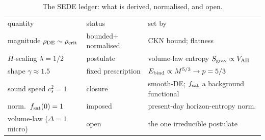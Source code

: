 \begin{table}[t]
\caption{The SEDE ledger: what is derived, normalised, and open.}\label{tab:ledger}
\begin{ruledtabular}
\small
\begin{tabular}{@{}p{}p{}p{}@{}}
quantity & status & set by \\ \colrule
magnitude $\rho_{\mathrm{DE}}\sim\rho_{\mathrm{crit}}$ & bounded$+$normalised & CKN bound; flatness \\
$H$-scaling $\lambda=1/2$ & postulate & volume-law entropy $S_{\rm grav}\propto V_{\mathrm{AH}}$ \\
shape $\gamma\approx1.5$ & fixed prescription & $E_{\rm bind}\propto M^{5/3}\to p=5/3$ \\
sound speed $c_s^2=1$ & closure & smooth-DE; $f_{\mathrm{sat}}$ a background functional \\
norm.\ $f_{\mathrm{sat}}(0)=1$ & imposed & present-day horizon-entropy norm. \\
volume-law ($\Delta=1$ micro) & open & the one irreducible postulate \\
\end{tabular}
\end{ruledtabular}
\end{table}

